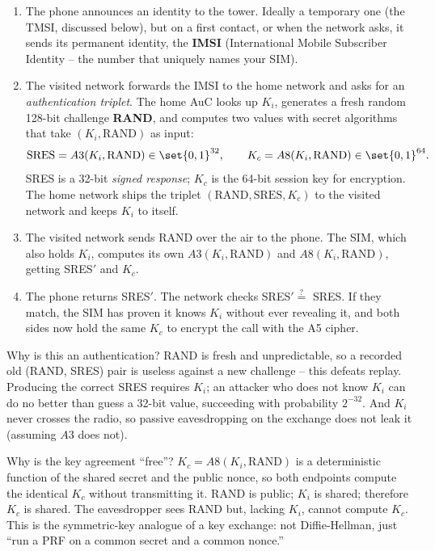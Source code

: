 \begin{enumerate}
  \item The phone announces an identity to the tower. Ideally a temporary one (the TMSI, discussed below), but on a first contact, or when the network asks, it sends its permanent identity, the \textbf{IMSI} (International Mobile Subscriber Identity -- the number that uniquely names your SIM).
  \item The visited network forwards the IMSI to the home network and asks for an \emph{authentication triplet}. The home AuC looks up $K_i$, generates a fresh random 128-bit challenge \textbf{RAND}, and computes two values with secret algorithms that take $(K_i, \text{RAND})$ as input:
  \[
    \text{SRES} = A3(K_i, \text{RAND}) \in \set{0,1}^{32},
    \qquad
    K_c = A8(K_i, \text{RAND}) \in \set{0,1}^{64}.
  \]
  SRES is a 32-bit \emph{signed response}; $K_c$ is the 64-bit session key for encryption. The home network ships the triplet $(\text{RAND}, \text{SRES}, K_c)$ to the visited network and keeps $K_i$ to itself.
  \item The visited network sends RAND over the air to the phone. The SIM, which also holds $K_i$, computes its own $A3(K_i,\text{RAND})$ and $A8(K_i,\text{RAND})$, getting SRES$'$ and $K_c$.
  \item The phone returns SRES$'$. The network checks SRES$' \stackrel{?}{=}$ SRES. If they match, the SIM has proven it knows $K_i$ without ever revealing it, and both sides now hold the same $K_c$ to encrypt the call with the A5 cipher.
\end{enumerate}

\begin{whybox}
Why is this an authentication? RAND is fresh and unpredictable, so a recorded old (RAND, SRES) pair is useless against a new challenge -- this defeats replay. Producing the correct SRES requires $K_i$; an attacker who does not know $K_i$ can do no better than guess a 32-bit value, succeeding with probability $2^{-32}$. And $K_i$ never crosses the radio, so passive eavesdropping on the exchange does not leak it (assuming $A3$ does not).

Why is the key agreement ``free''? $K_c = A8(K_i,\text{RAND})$ is a deterministic function of the shared secret and the public nonce, so both endpoints compute the identical $K_c$ without transmitting it. RAND is public; $K_i$ is shared; therefore $K_c$ is shared. The eavesdropper sees RAND but, lacking $K_i$, cannot compute $K_c$. This is the symmetric-key analogue of a key exchange: not Diffie-Hellman, just ``run a PRF on a common secret and a common nonce.''
\end{whybox}

